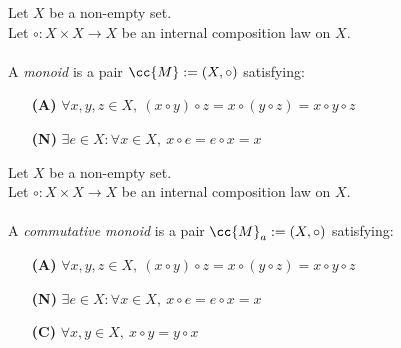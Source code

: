 \begin{definition}[Monoid]
    \label{def:monoid}
    Let \(X\) be a non-empty set.\\
    Let \(\circ: X\times X \to X\) be an internal composition law on \(X\). \\\\
    A \textit{monoid} is a pair \(\cc{M}:= (X, \circ)\) satisfying:
    \begin{enumerate}
        \item [\textbf{(A)}] \(\forall x,y,z\in X,\ (x\circ y)\circ z= x\circ (y\circ z) = x\circ y \circ z\)
        \item [\textbf{(N)}] \(\exists e \in X : \forall x \in X,\ x\circ e = e \circ x = x\)
    \end{enumerate}
\end{definition}

\begin{definition}
    \label{def:commutative_monoid}
    Let \(X\) be a non-empty set.\\
    Let \(\circ: X\times X \to X\) be an internal composition law on \(X\). \\\\
    A \textit{commutative monoid} is a pair \(\cc{M}_a:= (X, \circ)\) satisfying:
    \begin{enumerate}
        \item [\textbf{(A)}] \(\forall x,y,z\in X,\ (x\circ y)\circ z= x\circ (y\circ z) = x\circ y \circ z\)
        \item [\textbf{(N)}] \(\exists e \in X : \forall x \in X,\ x\circ e = e \circ x = x\)
        \item [\textbf{(C)}] \(\forall x,y\in X,\ x\circ y = y\circ x\)
    \end{enumerate}
\end{definition}

